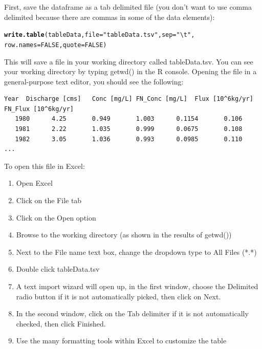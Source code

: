 \documentclass[a4paper,11pt]{article}\usepackage[]{graphicx}\usepackage[]{color}
\makeatletter
\newcommand{\hlnum}[1]{\textcolor[rgb]{0.686,0.059,0.569}{#1}}%
\newcommand{\hlstr}[1]{\textcolor[rgb]{0.192,0.494,0.8}{#1}}%
\newcommand{\hlstd}[1]{\textcolor[rgb]{0.345,0.345,0.345}{#1}}%
\newcommand{\hlkwc}[1]{\textcolor[rgb]{0.333,0.667,0.333}{#1}}%
\newcommand{\hlkwd}[1]{\textcolor[rgb]{0.737,0.353,0.396}{\textbf{#1}}}%
\newenvironment{kframe}{%
 \def\at@end@of@kframe{}%
 \ifinner\ifhmode%
  \def\at@end@of@kframe{\end{minipage}}%
  \begin{minipage}{\columnwidth}%
 \fi\fi%
 \def\FrameCommand##1{\hskip\@totalleftmargin \hskip-\fboxsep
 \colorbox{shadecolor}{##1}\hskip-\fboxsep
     \hskip-\linewidth \hskip-\@totalleftmargin \hskip\columnwidth}%
 \MakeFramed {\advance\hsize-\width
   \@totalleftmargin\z@ \linewidth\hsize
   \@setminipage}}%
 {\par\unskip\endMakeFramed%
 \at@end@of@kframe}
\newenvironment{knitrout}{}{} %
\makeatother
\begin{document}
First, save the dataframe as a tab delimited file (you don't want to use comma delimited because there are commas in some of the data elements):


\begin{knitrout}
\color{fgcolor}\begin{kframe}
\begin{alltt}
\hlkwd{write.table}\hlstd{(tableData,} \hlkwc{file}\hlstd{=}\hlstr{"tableData.tsv"}\hlstd{,}\hlkwc{sep}\hlstd{=}\hlstr{"\textbackslash{}t"}\hlstd{,}
            \hlkwc{row.names} \hlstd{=} \hlnum{FALSE}\hlstd{,}\hlkwc{quote}\hlstd{=}\hlnum{FALSE}\hlstd{)}
\end{alltt}
\end{kframe}
\end{knitrout}


This will save a file in your working directory called tableData.tsv.  You can see your working directory by typing getwd() in the R console. Opening the file in a general-purpose text editor, you should see the following:

\begin{verbatim}
Year  Discharge [cms]	Conc [mg/L]	FN_Conc [mg/L]	Flux [10^6kg/yr]	FN_Flux [10^6kg/yr]
   1980	     4.25	    0.949	    1.003	   0.1154	    0.106
   1981	     2.22	    1.035	    0.999	   0.0675	    0.108
   1982	     3.05	    1.036	    0.993	   0.0985	    0.110
...
\end{verbatim}

To open this file in Excel:
\begin{enumerate}
\item Open Excel
\item Click on the File tab
\item Click on the Open option
\item Browse to the working directory (as shown in the results of getwd())
\item Next to the File name text box, change the dropdown type to All Files (*.*)
\item Double click tableData.tsv
\item A text import wizard will open up, in the first window, choose the Delimited radio button if it is not automatically picked, then click on Next.
\item In the second window, click on the Tab delimiter if it is not automatically checked, then click Finished.
\item Use the many formatting tools within Excel to customize the table
\end{enumerate}
\end{document}
